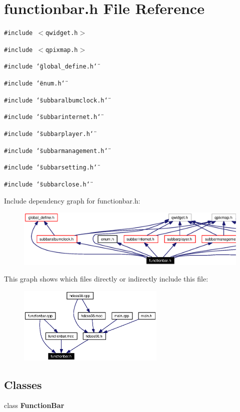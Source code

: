 \section{functionbar.h File Reference}
\label{functionbar_8h}


{\tt \#include $<$qwidget.h$>$}\par
{\tt \#include $<$qpixmap.h$>$}\par
{\tt \#include \char`\"{}global\_\-define.h\char`\"{}}\par
{\tt \#include \char`\"{}enum.h\char`\"{}}\par
{\tt \#include \char`\"{}subbaralbumclock.h\char`\"{}}\par
{\tt \#include \char`\"{}subbarinternet.h\char`\"{}}\par
{\tt \#include \char`\"{}subbarplayer.h\char`\"{}}\par
{\tt \#include \char`\"{}subbarmanagement.h\char`\"{}}\par
{\tt \#include \char`\"{}subbarsetting.h\char`\"{}}\par
{\tt \#include \char`\"{}subbarclose.h\char`\"{}}\par


Include dependency graph for functionbar.h:\begin{figure}[H]
\begin{center}
\leavevmode
\includegraphics[width=420pt]{functionbar_8h__incl}
\end{center}
\end{figure}


This graph shows which files directly or indirectly include this file:\begin{figure}[H]
\begin{center}
\leavevmode
\includegraphics[width=199pt]{functionbar_8h__dep__incl}
\end{center}
\end{figure}
\subsection*{Classes}
\begin{CompactItemize}
\item 
class {\bf Function\-Bar}
\end{CompactItemize}

